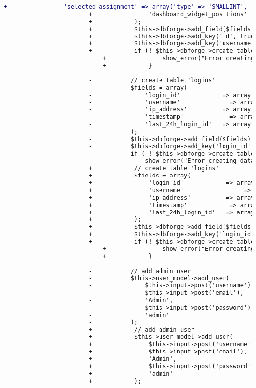 \begin{lstlisting}[language=diff, caption=Perubahan pada kode Install.php]
						+                'selected_assignment' => array('type' => 'SMALLINT', 'constraint' => 4, 'unsigned' => true, 'default' => 0),
						+                'dashboard_widget_positions'   => array('type' => 'VARCHAR', 'constraint' => 500, 'default' => ''),
						+            );
						+            $this->dbforge->add_field($fields);
						+            $this->dbforge->add_key('id', true); // PRIMARY KEY
						+            $this->dbforge->add_key('username'); // @todo is this needed?
						+            if (! $this->dbforge->create_table('users', true)) {
							+                show_error("Error creating database table ".$this->db->dbprefix('users'));
							+            }
						
						-			// create table 'logins'
						-			$fields = array(
						-				'login_id'            => array('type' => 'INT', 'constraint' => 11, 'unsigned' => TRUE, 'auto_increment' => TRUE),
						-				'username'         		=> array('type' => 'VARCHAR', 'constraint' => 20),
						-				'ip_address'          => array('type' => 'VARCHAR', 'constraint' => 15),
						-				'timestamp'          	=> array('type' => 'TIMESTAMP'),
						-				'last_24h_login_id'   => array('type' => 'INT', 'constraint' => 11, 'null' => TRUE),
						-			);
						-			$this->dbforge->add_field($fields);
						-			$this->dbforge->add_key('login_id', TRUE); // PRIMARY KEY
						-			if ( ! $this->dbforge->create_table('logins', TRUE))
						-				show_error("Error creating database table ".$this->db->dbprefix('logins'));
						+            // create table 'logins'
						+            $fields = array(
						+                'login_id'            => array('type' => 'INT', 'constraint' => 11, 'unsigned' => true, 'auto_increment' => true),
						+                'username'         		=> array('type' => 'VARCHAR', 'constraint' => 20),
						+                'ip_address'          => array('type' => 'VARCHAR', 'constraint' => 15),
						+                'timestamp'          	=> array('type' => 'TIMESTAMP'),
						+                'last_24h_login_id'   => array('type' => 'INT', 'constraint' => 11, 'null' => true),
						+            );
						+            $this->dbforge->add_field($fields);
						+            $this->dbforge->add_key('login_id', true); // PRIMARY KEY
						+            if (! $this->dbforge->create_table('logins', true)) {
							+                show_error("Error creating database table ".$this->db->dbprefix('logins'));
							+            }
						
						-			// add admin user
						-			$this->user_model->add_user(
						-				$this->input->post('username'),
						-				$this->input->post('email'),
						-				'Admin',
						-				$this->input->post('password'),
						-				'admin'
						-			);
						+            // add admin user
						+            $this->user_model->add_user(
						+                $this->input->post('username'),
						+                $this->input->post('email'),
						+                'Admin',
						+                $this->input->post('password'),
						+                'admin'
						+            );
						

\end{lstlisting}
